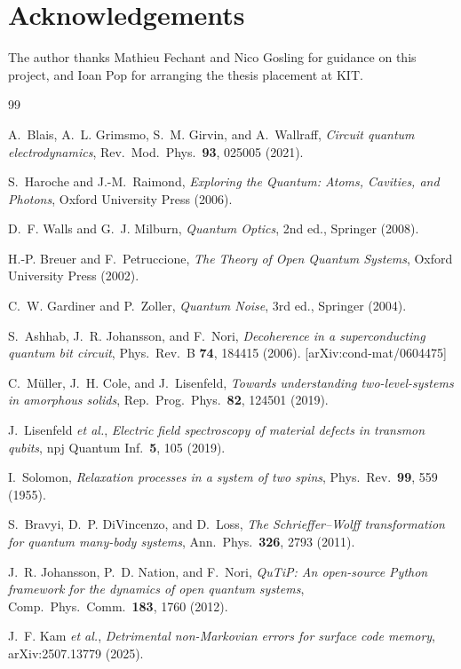 \documentclass[12pt,a4paper]{article}
\begin{document}
\section*{Acknowledgements}
The author thanks Mathieu Fechant and Nico Gosling for guidance on this
project, and Ioan Pop for arranging the thesis placement at KIT.


\begin{thebibliography}{99}

A.~Blais, A.~L. Grimsmo, S.~M. Girvin, and A.~Wallraff,
\emph{Circuit quantum electrodynamics},
Rev.\ Mod.\ Phys.\ \textbf{93}, 025005 (2021).

S.~Haroche and J.-M.~Raimond,
\emph{Exploring the Quantum: Atoms, Cavities, and Photons},
Oxford University Press (2006).

D.~F. Walls and G.~J. Milburn,
\emph{Quantum Optics}, 2nd ed.,
Springer (2008).

H.-P. Breuer and F.~Petruccione,
\emph{The Theory of Open Quantum Systems},
Oxford University Press (2002).

C.~W. Gardiner and P.~Zoller,
\emph{Quantum Noise}, 3rd ed.,
Springer (2004).

S.~Ashhab, J.~R. Johansson, and F.~Nori,
\emph{Decoherence in a superconducting quantum bit circuit},
Phys.\ Rev.\ B \textbf{74}, 184415 (2006).
[arXiv:cond-mat/0604475]

C.~M\"uller, J.~H. Cole, and J.~Lisenfeld,
\emph{Towards understanding two-level-systems in amorphous solids},
Rep.\ Prog.\ Phys.\ \textbf{82}, 124501 (2019).

J.~Lisenfeld \emph{et al.},
\emph{Electric field spectroscopy of material defects in transmon qubits},
npj Quantum Inf.\ \textbf{5}, 105 (2019).

I.~Solomon,
\emph{Relaxation processes in a system of two spins},
Phys.\ Rev.\ \textbf{99}, 559 (1955).

S.~Bravyi, D.~P. DiVincenzo, and D.~Loss,
\emph{The Schrieffer--Wolff transformation for quantum many-body systems},
Ann.\ Phys.\ \textbf{326}, 2793 (2011).

J.~R. Johansson, P.~D. Nation, and F.~Nori,
\emph{QuTiP: An open-source Python framework for the dynamics of open
quantum systems},
Comp.\ Phys.\ Comm.\ \textbf{183}, 1760 (2012).

J.~F. Kam \emph{et al.},
\emph{Detrimental non-Markovian errors for surface code memory},
arXiv:2507.13779 (2025).

\end{thebibliography}
\end{document}
